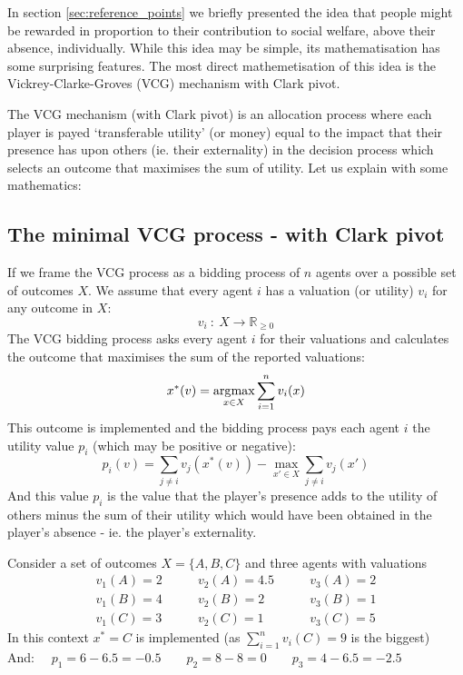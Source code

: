 In section \ref{sec:reference_points} we briefly presented the idea that people might be rewarded in proportion to their contribution to social welfare, above their absence, individually.
While this idea may be simple, its mathematisation has some surprising features.
The most direct mathemetisation of this idea is the Vickrey-Clarke-Groves (VCG) mechanism with Clark pivot.

The VCG mechanism (with Clark pivot) is an allocation process where each player is payed `transferable utility' (or money) equal to the impact that their presence has upon others (ie. their externality) in the decision process which selects an outcome that maximises the sum of utility.
Let us explain with some mathematics:

\subsection{The minimal VCG process - with Clark pivot}
If we frame the VCG process as a bidding process of $n$ agents over a possible set of outcomes $X$.
We assume that every agent $i$ has a valuation (or utility) $v_i$ for any outcome in $X$:
$$ v_i~:~X\rightarrow \mathbb{R}_{\ge 0} $$
The VCG bidding process asks every agent $i$ for their valuations and calculates the outcome that maximises the sum of the reported valuations:
$$ x^*(v) = \operatorname*{\arg\!\max}_{x\in X}\sum_{i=1}^{n}v_i(x) $$
This outcome is implemented and the bidding process pays each agent $i$ the utility value $p_i$ (which may be positive or negative):
\begin{equation}\label{eq:VCG_payment_rule} p_i(v)=\sum_{j\ne i}v_j(x^*(v)) - \max_{x'\in X}\sum_{j\ne i}v_j(x') \end{equation}
And this value $p_i$ is the value that the player's presence adds to the utility of others minus the sum of their utility which would have been obtained in the player's absence - ie. the player's externality.

\begin{example}
Consider a set of outcomes $X = \{A,B,C\}$ and three agents with valuations 
$$\begin{matrix}v_1(A) = 2\\v_1(B) = 4\\v_1(C) = 3\end{matrix}\quad\quad
\begin{matrix}v_2(A) = 4.5\\v_2(B) = 2\\v_2(C) = 1\end{matrix}\quad\quad
\begin{matrix}v_3(A) = 2\\v_3(B) = 1\\v_3(C) = 5\end{matrix}$$
In this context $x^* = C$ is implemented (as $\sum_{i=1}^nv_i(C)=9$ is the biggest)\\And:
$\quad p_1 = 6-6.5 = -0.5 \quad\quad p_2 = 8-8 = 0\quad\quad p_3 = 4-6.5 = -2.5 $
\end{example}

